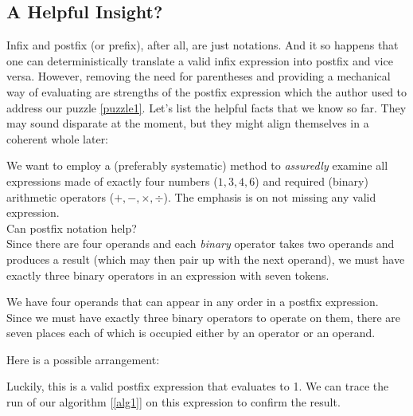 \documentclass[english,smartquotes]{hgbarticle}
\newenvironment{arrangement}{\captionsetup{type=mytype}}{}
\begin{document}
\subsection{A Helpful Insight?}
Infix and postfix (or prefix), after all, are just notations. And it so happens that one can deterministically translate a valid infix expression into postfix and vice versa. 
However, removing the need for parentheses and providing a mechanical way of evaluating are strengths of the postfix expression which the author used to address our puzzle \ref{puzzle1}. Let's list the helpful facts that we know so far. They may sound disparate at the moment, but they might align themselves in a coherent whole later:
\begin{tcolorbox}
[
colback=yellow!20,
colframe=cyan,
sharp corners,
boxrule=0.5pt,
]
We want to employ a (preferably systematic) method to \emph{assuredly} examine all expressions made of exactly four numbers ($1, 3, 4, 6$) and required (binary) arithmetic operators ($+, -, \times, \div$). The emphasis is on not missing any valid expression. \\

Can postfix notation help? \\

Since there are four operands and each \emph{binary} operator takes two operands and produces a result (which may then pair up with the next operand), we must have exactly three binary operators in an expression with seven tokens.
\end{tcolorbox}

We have four operands that can appear in any order in a postfix expression. Since we must have exactly three binary operators to operate on them, there are seven places each of which is occupied either by an operator or an operand. 

Here is a possible arrangement:

\begin{arrangement}
\vspace{2mm}
\centering
{}
\label{goodperm1}
\end{arrangement}

Luckily, this is a valid postfix expression that evaluates to 1. We can trace the run of our algorithm [\ref{alg1}] on this expression to confirm the result.
\end{document}
